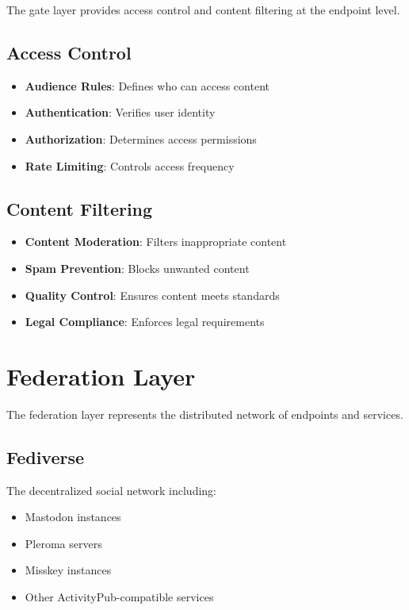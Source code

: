 \documentclass[11pt]{article}
\begin{document}
The gate layer provides access control and content filtering at the endpoint level.

\subsection{Access Control}

\begin{itemize}
    \item \textbf{Audience Rules}: Defines who can access content
    \item \textbf{Authentication}: Verifies user identity
    \item \textbf{Authorization}: Determines access permissions
    \item \textbf{Rate Limiting}: Controls access frequency
\end{itemize}

\subsection{Content Filtering}

\begin{itemize}
    \item \textbf{Content Moderation}: Filters inappropriate content
    \item \textbf{Spam Prevention}: Blocks unwanted content
    \item \textbf{Quality Control}: Ensures content meets standards
    \item \textbf{Legal Compliance}: Enforces legal requirements
\end{itemize}

\section{Federation Layer}

The federation layer represents the distributed network of endpoints and services.

\subsection{Fediverse}

The decentralized social network including:
\begin{itemize}
    \item Mastodon instances
    \item Pleroma servers
    \item Misskey instances
    \item Other ActivityPub-compatible services
\end{itemize}
\end{document}

